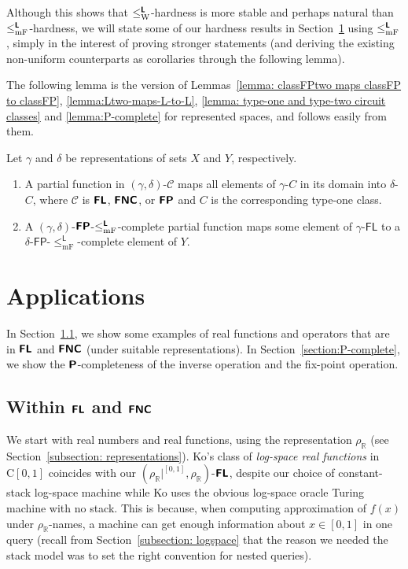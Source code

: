 \documentclass[envcountsect,envcountsame,orivec,oribibl]{llncs}
\newcommand{\R}{\mathbb R}
\newcommand{\classonefont}[1]{\mathsf{#1}}
\newcommand{\classL}{\classonefont{L}}
\newcommand{\classFL}{\classonefont{FL}}
\newcommand{\classFP}{\classonefont{FP}}
\newcommand{\classtwofont}[1]{\text{\bfseries \sffamily \upshape #1}}
\newcommand{\classLtwo}{\classtwofont{L}}
\newcommand{\classFLtwo}{\classtwofont{FL}}
\newcommand{\classFNCtwo}{\classtwofont{FNC}}
\newcommand{\classPtwo}{\classtwofont{P}}
\newcommand{\classFPtwo}{\classtwofont{FP}}
\newcommand{\rhoR}{\rho _\R}
\newcommand{\rhoRunit}{\rho _\R|^{[0,1]}}
\newcommand{\redW}{\leq _{\mathrm W}}
\newcommand{\redmF}{\leq _{\mathrm{mF}}}
\newcommand{\redLW}{\redW ^{\classLtwo}}
\newcommand{\redLmF}{\redmF ^{\classLtwo}}
\newcommand{\classC}{\mathrm C}
\begin{document}
Although this shows that $\redLW$-hardness is 
more stable and perhaps natural 
than $\redLmF$-hardness, 
we will state some of our hardness results in Section~\ref{section:applications}
using $\redLmF$, 
simply in the interest of proving stronger statements
(and deriving the existing non-uniform counterparts as corollaries
through the following lemma). 

The following lemma is the version of 
Lemmas~\ref{lemma: classFPtwo maps classFP to classFP}, 
\ref{lemma:Ltwo-maps-L-to-L}, 
\ref{lemma: type-one and type-two circuit classes} and 
\ref{lemma:P-complete} for represented spaces, 
and follows easily from them. 

\begin{lemma}
\label{lemma:p-comp-maps-l-to-p-comp}
 Let $\gamma$ and $\delta$ be representations of sets $X$ and $Y$, respectively.
\begin{enumerate}
\item
 A partial function in $(\gamma, \delta)$-$\mathcal C$
 maps all elements of $\gamma$-$C$ in its domain into $\delta$-$C$, 
 where $\mathcal C$ is $\classFLtwo$, $\classFNCtwo$, or $\classFPtwo$ 
 and $C$ is the corresponding type-one class. 
\item \label{enumi:p-comp-maps-l-to-p-comp}
 A $(\gamma, \delta)$-$\classFPtwo$-$\redLmF$-complete partial function 
 maps some element of $\gamma$-$\classFL$ 
 to a $\delta$-$\classFP$-$\redmF^\classL$-complete element of $Y$.
\end{enumerate}
\end{lemma}

\section{Applications}
\label{section:applications}

In Section~\ref{section:function}, 
we show some examples of real functions and operators 
that are in $\classFLtwo$ and $\classFNCtwo$ (under suitable representations). 
In Section~\ref{section:P-complete}, we show the $\classPtwo$-completeness of 
the inverse operation and the fix-point operation.

\subsection{Within $\classFLtwo$ and $\classFNCtwo$}
\label{section:function}

We start with real numbers and real functions, 
using the representation $\rhoR$
(see Section~\ref{subsection: representations}). 
Ko's class of
\emph{log-space real functions} in $\classC[0,1]$ 
\cite{ko1991complexity} 
coincides with our $(\rhoRunit, \rhoR)$-$\classFLtwo$, 
despite our choice of constant-stack log-space machine 
while Ko uses the obvious log-space oracle Turing machine 
with no stack.
This is because, 
when computing approximation of $f(x)$ under $\rhoR$-names, 
a machine can get enough information about $x \in [0,1]$ in one query
(recall from Section~\ref{subsection: logspace} that 
the reason we needed the stack model 
was to set the right convention for nested queries).
\end{document}

